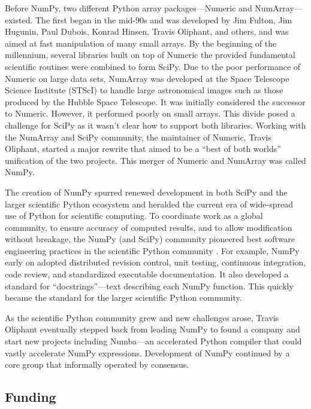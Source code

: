 Before NumPy, two different Python array packages—Numeric and NumArray—existed.
The first began in the mid-90s and was developed by Jim Fulton, Jim Hugunin,
Paul Dubois, Konrad Hinsen, Travis Oliphant, and others, and was aimed at fast
manipulation of many small arrays.
By the beginning of the millennium, several libraries built on top of Numeric 
the provided fundamental scientific routines were combined to form SciPy.
Due to the poor performance of Numeric on large data sets, NumArray was
developed at the Space Telescope Science Institute (STScI) to handle
large astronomical images such as those produced by the Hubble Space Telescope.
It was initially considered the successor to Numeric.
However, it performed poorly on small arrays.
This divide posed a challenge for SciPy as it wasn't clear how to support
both libraries.
Working with the NumArray and SciPy community, the maintainer of Numeric,
Travis Oliphant, started a major rewrite that aimed to be a ``best of both
worlds'' unification of the two projects.  %
This merger of Numeric and NumArray was called NumPy.

The creation of NumPy spurred renewed development in both SciPy and the larger
scientific Python ecosystem and heralded the current era of wide-spread use of
Python for scientific computing.
To coordinate work as a global community, to ensure accuracy of computed
results, and to allow modification without breakage, the NumPy (and SciPy) community
pioneered best software engineering practices in the scientific Python
community  \cite{millman2014developing}.
For example, NumPy early on adopted distributed revision control, unit testing,
continuous integration, code review, and standardized executable documentation.
It also developed a standard for ``docstrings''—text describing each NumPy function.
This quickly became the standard for the larger scientific Python community. 

As the scientific Python community grew and new challenges arose, Travis Oliphant
eventually stepped back from leading NumPy to found a company and start
new projects including Numba---an accelerated Python compiler that could vastly
accelerate NumPy expressions.
Development of NumPy continued by a core group that informally operated by consensus.


\subsection*{Funding}

